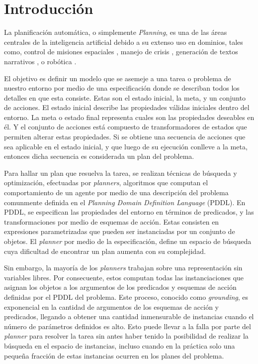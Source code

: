 \chapter{Introducción}
\label{ch:into}

La planificación automática, o simplemente \emph{Planning}, es una de las áreas
centrales de la inteligencia artificial debido a su extenso uso en dominios,
tales como, control de misiones espaciales \citep{RabideauG-et-al-2001}, manejo
de crisis \citep{Bienkowki-1995}, generación de textos narrativos
\citep{Goudoulakis-et-al-2016}, o robótica \citep{Munoz-et-al-2016}.

El objetivo es definir un modelo que se asemeje a una tarea o problema de
nuestro entorno por medio de una especificación donde se describan todos los
detalles en que esta consiste. Estas son el estado inicial, la meta, y un
conjunto de acciones. El estado inicial describe las propiedades válidas
iniciales dentro del entorno. La meta o estado final representa cuales son las
propiedades deseables en él. Y el conjunto de acciones está compuesto de
transformadores de estados que permiten alterar estas propiedades. Si se obtiene
una secuencia de acciones que sea aplicable en el estado inicial, y que luego de
su ejecución conlleve a la meta, entonces dicha secuencia es considerada un plan
del problema. \citep{Georgievski-et-al-2016}

Para hallar un plan que resuelva la tarea, se realizan técnicas de búsqueda y
optimización, efectuadas por \emph{planners}, algoritmos que computan el
comportamiento de un agente por medio de una descripción del problema comunmente
definida en el \emph{Planning Domain Definition Language} (PDDL). En PDDL, se
especifican las propiedades del entorno en términos de predicados, y las
transformaciones por medio de esquemas de acción. Estas consisten en expresiones
parametrizadas que pueden ser instanciadas por un conjunto de objetos. El
\emph{planner} por medio de la especificación, define un espacio de búsqueda
cuya dificultad de encontrar un plan aumenta con su complejidad.
\citep{Georgievski-et-al-2016}

Sin embargo, la mayoría de los \emph{planners} trabajan sobre una representación
sin variables libres. Por consecuente, estos computan todas las instanciaciones
que asignan los objetos a los argumentos de los predicados y esquemas de acción
definidas por el PDDL del problema. Este proceso, conocido como
\emph{grounding}, es exponencial en la cantidad de argumentos de los esquemas de
acción y predicados, llegando a obtener una cantidad inmensurable de instancias
cuando el número de parámetros definidos es alto. Esto puede llevar a la falla
por parte del \emph{planner} para resolver la tarea sin antes haber tenido la
posibilidad de realizar la búsqueda en el espacio de instancias, incluso cuando
en la práctica solo una pequeña fracción de estas instancias ocurren en los
planes del problema. \citep{Gnad_Torralba_Dominguez_Areces_Bustos_2019}

